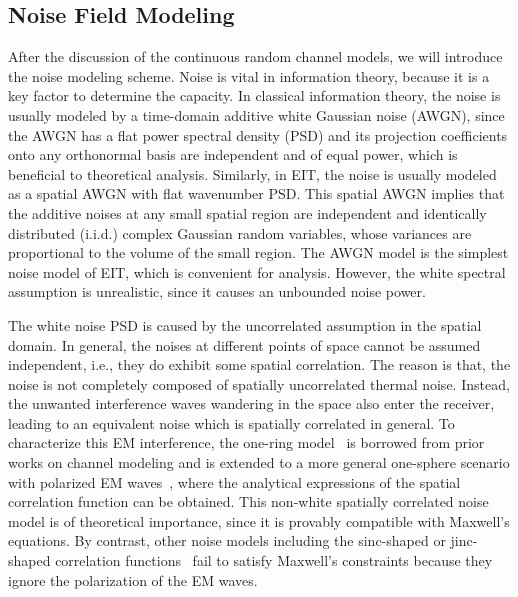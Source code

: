 \documentclass[journal,twocolumn]{IEEEtran}
\begin{document}
\subsection{Noise Field Modeling}
After the discussion of the continuous random channel models, we will introduce the noise modeling scheme. 
Noise is vital in information theory, because it is a key factor to determine the capacity. 
In classical information theory, the noise is usually modeled by a time-domain additive white Gaussian noise (AWGN), since the AWGN has a flat power spectral density (PSD) and its projection coefficients onto any orthonormal basis are independent and of equal power, which is beneficial to theoretical analysis. 
Similarly, in EIT, the noise is usually modeled as a spatial AWGN with flat wavenumber PSD. This spatial AWGN implies that the additive noises at any small spatial region are independent and identically distributed (i.i.d.) complex Gaussian random variables, whose variances are proportional to the volume of the small region. The AWGN model is the simplest noise model of EIT, which is convenient for analysis. However, the white spectral assumption is unrealistic, since it causes an unbounded noise power. 

The white noise PSD is caused by the uncorrelated assumption in the spatial domain. In general, the noises at different points of space cannot be assumed independent, i.e., they do exhibit some spatial correlation. 
The reason is that, the noise is not completely composed of spatially uncorrelated thermal noise. 
Instead, the unwanted interference waves wandering in the space also enter the receiver, leading to an equivalent noise which is spatially correlated in general. 
To characterize this EM interference, the one-ring model~\cite{byers2004spatially} is borrowed from prior works on channel modeling and is extended to a more general one-sphere scenario with polarized EM waves~\cite{wan2022mutual}, where the analytical expressions of the spatial correlation function can be obtained. 
This non-white spatially correlated noise model is of theoretical importance, since it is provably compatible with Maxwell's equations. 
By contrast, other noise models including the sinc-shaped or jinc-shaped correlation functions~\cite{marzetta2022fourier} fail to satisfy Maxwell's constraints because they ignore the polarization of the EM waves. 
\end{document}
